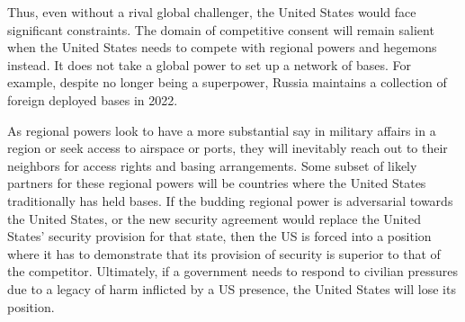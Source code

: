 
Thus, even without a rival global challenger, the United States would face significant constraints. The domain of competitive consent will remain salient when the United States needs to compete with regional powers and hegemons instead. It does not take a global power to set up a network of bases. For example, despite no longer being a superpower, Russia maintains a collection of foreign deployed bases in 2022. 

As regional powers look to have a more substantial say in military affairs in a region or seek access to airspace or ports, they will inevitably reach out to their neighbors for access rights and basing arrangements. Some subset of likely partners for these regional powers will be countries where the United States traditionally has held bases. If the budding regional power is adversarial towards the United States, or the new security agreement would replace the United States' security provision for that state, then the US is forced into a position where it has to demonstrate that its provision of security is superior to that of the competitor.\cite[][Morrow argues that strategic security alliances between strong and weak states offer a trade-off for both countries. The more vulnerable state gets to outsource its costly security provision to a stronger state, and the stronger state gets some control over the state's foreign policy. It trades security for autonomy. Under those conditions, additional security may be complementary, but major power security provision is more likely to be a substitutable good. In these cases, the United States could lose out to ideologically aligned allies, such as how the United States has supplanted the United Kingdom in several of its former bases.]{morrow1991} Ultimately, if a government needs to respond to civilian pressures due to a legacy of harm inflicted by a US presence, the United States will lose its position.\cite{Mcmanus2017}

